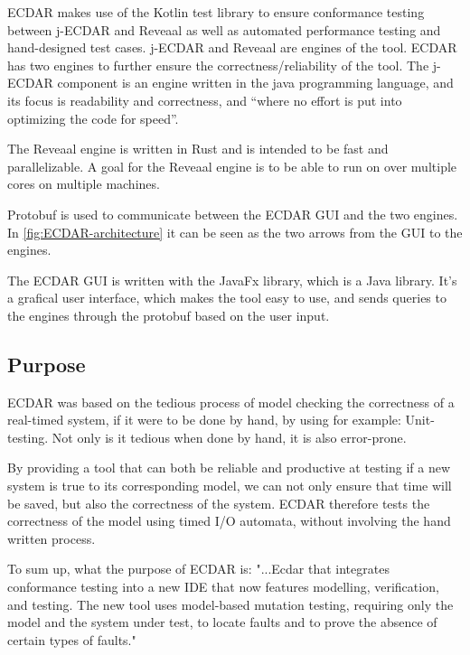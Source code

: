 
ECDAR makes use of the Kotlin test library to ensure conformance testing between j-ECDAR and Reveaal as well as automated performance testing and hand-designed test cases. 
j-ECDAR and Reveaal are engines of the tool. 
ECDAR has two engines to further ensure the correctness/reliability of the tool. 
The j-ECDAR component is an engine written in the java programming language, and its focus is readability and correctness, and ``where no effort is put into optimizing the code for speed''.\cite{ECDARNET} %

The Reveaal engine is written in Rust and is intended to be fast and parallelizable. A goal for the Reveaal engine is to be able to run on over multiple cores on multiple machines. 

Protobuf is used to communicate between the ECDAR GUI and the two engines. In \autoref{fig:ECDAR-architecture} it can be seen as the two arrows from the GUI to the engines.

The ECDAR GUI is written with the JavaFx library, which is a Java library. 
It's a grafical user interface, which makes the tool easy to use, and sends queries to the engines through the protobuf based on the user input.

\subsection{Purpose}
ECDAR was based on the tedious process of model checking the correctness of a real-timed system, if it were to be done by hand, by using for example: Unit-testing.
Not only is it tedious when done by hand, it is also error-prone.

By providing a tool that can both be reliable and productive at testing if a new system is true to its corresponding model, we can not only ensure that time will be saved, but also the correctness of the system.
ECDAR therefore tests the correctness of the model using timed I/O automata, without involving the hand written process.

To sum up, what the purpose of ECDAR is:
"...Ecdar that integrates conformance testing into a new IDE that now features
modelling, verification, and testing. The new tool uses model-based mutation testing, requiring only
the model and the system under test, to locate faults and to prove the absence of certain types of
faults." \cite{Gundersen_2018}



